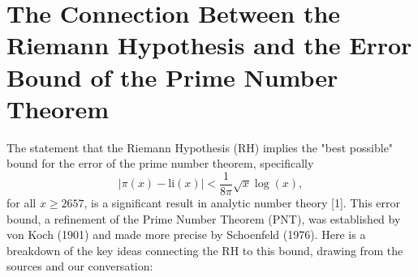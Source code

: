 \documentclass{article}
\begin{document}
\section*{The Connection Between the Riemann Hypothesis and the Error Bound of the Prime Number Theorem}

The statement that the Riemann Hypothesis (RH) implies the "best possible" bound for the error of the prime number theorem, specifically 
\begin{equation*}
    |\pi(x) - \text{li}(x)| < \frac{1}{8\pi} \sqrt{x} \log(x),
\end{equation*}
for all $x \geq 2657$, is a significant result in analytic number theory [1]. This error bound, a refinement of the Prime Number Theorem (PNT), was established by von Koch (1901) and made more precise by Schoenfeld (1976). Here is a breakdown of the key ideas connecting the RH to this bound, drawing from the sources and our conversation:
\end{document}

